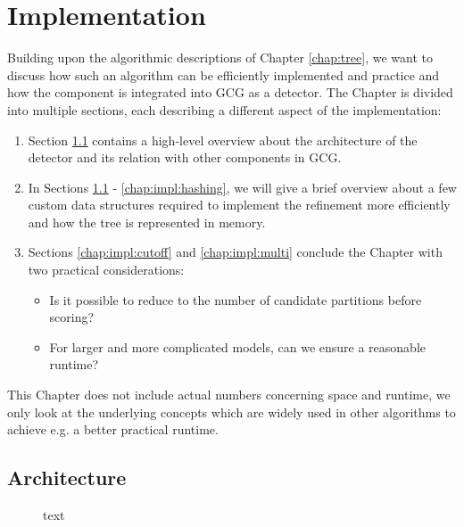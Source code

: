 \chapter{Implementation}
\label{chap:impl}

	Building upon the algorithmic descriptions of Chapter \ref{chap:tree}, we want to discuss how such an algorithm can be efficiently implemented and practice and how the component is integrated into \ac{GCG} as a detector.
	The Chapter is divided into multiple sections, each describing a different aspect of the implementation:

	\begin{enumerate}
		\item Section \ref{chap:impl:architecture} contains a high-level overview about the architecture of the detector and its relation with other components in \ac{GCG}.
		\item In Sections \ref{chap:impl:architecture} - \ref{chap:impl:hashing}, we will give a brief overview about a few custom data structures required to implement the refinement more efficiently and how the tree is represented in memory.
		\item Sections \ref{chap:impl:cutoff} and \ref{chap:impl:multi} conclude the Chapter with two practical considerations:
		\begin{itemize}
			\item Is it possible to reduce to the number of candidate partitions before scoring?
			\item For larger and more complicated models, can we ensure a reasonable runtime?
		\end{itemize}
	\end{enumerate}

	This Chapter does not include actual numbers concerning space and runtime, we only look at the underlying concepts which are widely used in other algorithms to achieve e.g. a better practical runtime.

	\clearpage

	\section{Architecture}
	\label{chap:impl:architecture}

		\begin{figure}[ht!]
			\centering
			
			\caption{text}
			\label{fig:impl:arch:overview}
		\end{figure}

